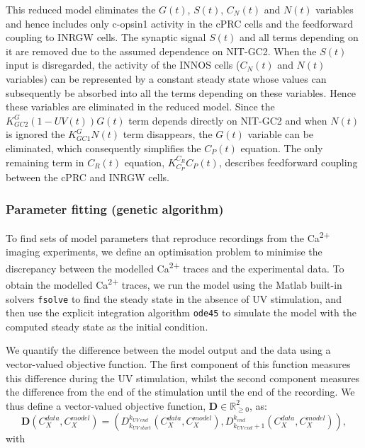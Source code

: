 \documentclass[
  10pt,
  onecolumn]{article}
\begin{document}
This reduced model eliminates the \(G(t)\), \(S(t)\), \(C_N(t)\) and
\(N(t)\) variables and hence includes only c-opsin1 activity in the cPRC
cells and the feedforward coupling to INRGW cells. The synaptic signal
\(S(t)\) and all terms depending on it are removed due to the assumed
dependence on NIT-GC2. When the \(S(t)\) input is disregarded, the
activity of the INNOS cells (\(C_N(t)\) and \(N(t)\) variables) can be
represented by a constant steady state whose values can subsequently be
absorbed into all the terms depending on these variables. Hence these
variables are eliminated in the reduced model. Since the
\(K_{GC2}^G \left(1 - UV(t)\right) G(t)\) term depends directly on
NIT-GC2 and when \(N(t)\) is ignored the \(K_{GC1}^G N(t)\) term
disappears, the \(G(t)\) variable can be eliminated, which consequently
simplifies the \(C_P(t)\) equation. The only remaining term in
\(C_R(t)\) equation, \(K_{C_P}^{C_R} C_P(t)\), describes feedforward
coupling between the cPRC and INRGW cells.

\hypertarget{parameter-fitting-genetic-algorithm}{%
\subsubsection{Parameter fitting (genetic
algorithm)}\label{parameter-fitting-genetic-algorithm}}

To find sets of model parameters that reproduce recordings from the
Ca\textsuperscript{2+} imaging experiments, we define an optimisation
problem to minimise the discrepancy between the modelled
Ca\textsuperscript{2+} traces and the experimental data. To obtain the
modelled Ca\textsuperscript{2+} traces, we run the model using the
Matlab built-in solvers \texttt{fsolve} to find the steady state in the
absence of UV stimulation, and then use the explicit integration
algorithm \texttt{ode45} to simulate the model with the computed steady
state as the initial condition.

We quantify the difference between the model output and the data using a
vector-valued objective function. The first component of this function
measures this difference during the UV stimulation, whilst the second
component measures the difference from the end of the stimulation until
the end of the recording. We thus define a vector-valued objective
function, \(\mathbf{D} \in \mathbb{R}^2_{\geq 0}\), as:
\begin{equation*}
 \mathbf{D}\left({C}_X^{data},{C}_X^{model}\right)=\left(D_{k_{UV\: start}}^{k_{UV\: end}}\left({C}_X^{data},{C}_X^{model}\right),D_{k_{UV\: end }+1}^{k_{end}}\left({C}_X^{data},{C}_X^{model}\right) \right),
\end{equation*} with
\end{document}
